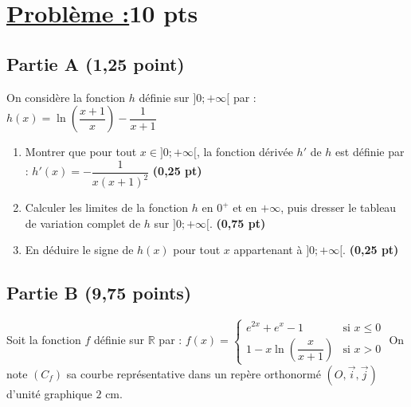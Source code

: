 \documentclass[12pt,a4paper]{article}
\begin{document}
\section*{\underline{Problème :}\quad\textbf{10 pts}} 

\subsection*{Partie A (1,25 point)}

On considère la fonction $h$ définie sur $]0 ; +\infty[$ par : 
$h(x) = \ln\left(\dfrac{x+1}{x}\right) - \dfrac{1}{x+1}$

\begin{enumerate}
    \item Montrer que pour tout $x \in ]0 ; +\infty[$, la fonction dérivée $h'$ de $h$ est définie par :
    $h'(x) = -\dfrac{1}{x(x+1)^2}$ \hfill \textbf{(0,25 pt)}
    
    \item Calculer les limites de la fonction $h$ en $0^+$ et en $+\infty$, puis dresser le tableau de variation complet de $h$ sur $]0 ; +\infty[$. \hfill \textbf{(0,75 pt)}
    
    \item En déduire le signe de $h(x)$ pour tout $x$ appartenant à $]0 ; +\infty[$. \hfill \textbf{(0,25 pt)}
\end{enumerate}

\subsection*{Partie B (9,75 points)}

Soit la fonction $f$ définie sur $\mathbb{R}$ par :
$f(x) = \begin{cases} 
e^{2x} + e^x - 1 & \text{si } x \le 0 \\ 
1 - x\ln\left(\dfrac{x}{x+1}\right) & \text{si } x > 0 
\end{cases}$
On note $(C_f)$ sa courbe représentative dans un repère orthonormé $(O, \vec{i}, \vec{j})$ d'unité graphique $2\text{ cm}$.
\end{document}
